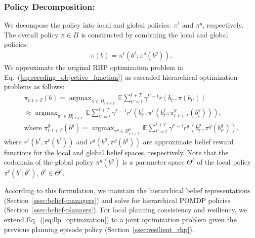 \documentclass[letterpaper]{article} %
\newcommand{\phdone}[1]{} %
\newcommand{\argmax}{\mathop{\mathrm{argmax}}}
\begin{document}
\subsubsection{Policy Decomposition:} \hfill
\vspace{-0.25pt}

\noindent
We decompose the policy into local and global policies: $\pi^\ell$ and $\pi^g$, respectively. The overall policy $\pi \in \Pi$ is constructed by combining the local and global policies:
\begin{align}
  &\pi(b) = \pi^\ell(b^\ell; \pi^g(b^g)).
\end{align}
%
We approximate the original RHP optimization problem in Eq.~(\ref{eq:receding_objective_function}) as cascaded hierarchical optimization problems as follows:
\begin{align}
  &\pi_{t:t+T}(b)
  = \argmax_{\pi \in \Pi_{t:t+T}} \, \mathbb{E} \sum_{t'=t}^{t+T} \gamma^{t'-t} r(b_{t'}, \pi(b_{t'}))
  \nonumber \\
  & \approx \argmax_{\pi^\ell \in \Pi^\ell_{t:t+T}} \, \mathbb{E} \sum_{t'=t}^{t+T} \gamma^{t'-t} r^\ell(b^\ell_{t'}, \pi^\ell(b^\ell_{t'}; \pi_{t:t+T}^g(b^g_t))),
  \label{eq:llp_optimization}
  \\
  &\text{where }
  \pi_{t:t+T}^g(b^g) = \argmax_{\pi^g \in \Pi^g_{t:t+T}} \, \mathbb{E} \sum_{t'=t}^{t+T} \gamma^{t'-t} r^g(b^g_{t'}, \pi^g(b^g_{t'})).
  \label{eq:glp_optimization}
\end{align}
\normalsize
where $r^\ell(b^\ell, \pi^\ell(b^\ell))$ and $r^g(b^g, \pi^g(b^g))$ are approximate belief reward functions for the local and global belief spaces, respectively.
%
Note that the codomain of the global policy $\pi^g(b^g)$ is a parameter space $\Theta^\ell$ of the local policy $\pi^\ell(b^\ell; \theta^\ell)$, $\theta^\ell \!\! \in \! \Theta^\ell\!$.\,

\phdone{Section Structure}
According to this formulation, we maintain the hierarchical belief representations (Section~\ref{ssec:belief-managers}) and solve for hierarchical POMDP policies (Section~\ref{ssec:belief-planners}).
For local planning consistency and resiliency, we extend Eq.~(\ref{eq:llp_optimization}) to a joint optimization problem given the previous planning episode policy (Section~\ref{ssec:resilient_rhp}).
\end{document}
